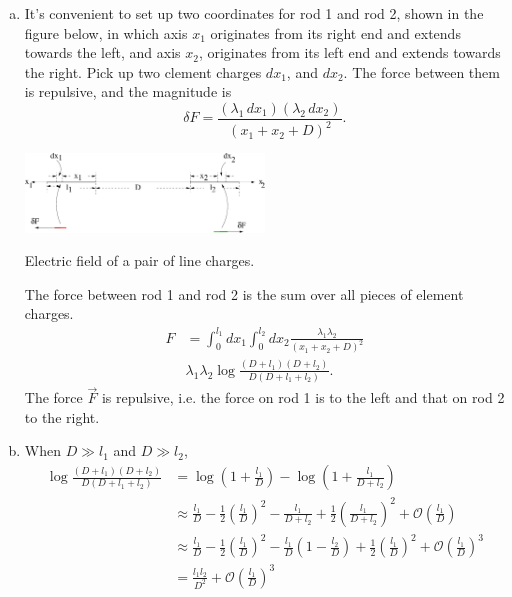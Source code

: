 \documentclass{esg8022pset}
\begin{document}
\begin{solution}
  \begin{enumerate}[(a)]
    \item It's convenient to set up two coordinates for rod 1 and rod 2, shown in the figure below, in which axis $x_1$ originates from its right end and extends towards the left, and axis $x_2$, originates from its left end and extends towards the right.  Pick up two clement charges $dx_1$, and $dx_2$. The force between them is repulsive, and the magnitude is 
    \begin{equation*}
      \delta F = \frac{(\lambda_1\,dx_1)(\lambda_2\,dx_2)}{(x_1 + x_2 + D)^2}.
    \end{equation*}
    \begin{center}\includegraphics[width=0.5\textwidth]{ps01_sol_08}\end{center}
    \begin{center}Electric field of a pair of line charges.\end{center}
    The force between rod 1 and rod 2 is the sum over all pieces of element charges.
    \begin{align*}
      F & = \int_0^{l_1}dx_1\int_0^{l_2}dx_2\frac{\lambda_1\lambda_2}{(x_1 + x_2 + D)^2} \\
        & \lambda_1 \lambda_2 \log\frac{(D + l_1)(D + l_2)}{D(D + l_1 + l_2)}.
    \end{align*}
    The force $\vec F$ is repulsive, i.e. the force on rod 1 is to the left and that on rod 2 to the right.
  \item When $D \gg l_1$ and $D \gg l_2$,
    \begin{align*}
      \log\frac{(D + l_1)(D + l_2)}{D(D + l_1 + l_2)} & = \log(1 + \frac{l_1}{D}) - \log(1 + \frac{l_1}{D + l_2}) \\
        & \approx \frac{l_1}{D} - \frac12 \left(\frac{l_1}{D}\right)^2 - \frac{l_1}{D + l_2} + \frac12 \left(\frac{l_1}{D + l_2}\right)^2 + \mathcal O\left(\frac{l_1}{D}\right) \\
        & \approx \frac{l_1}{D} - \frac12\left(\frac{l_1}{D}\right)^2 - \frac{l_1}{D}(1 - \frac{l_2}{D}) + \frac12 \left(\frac{l_1}{D}\right)^2 + \mathcal O\left(\frac{l_1}{D}\right)^3 \\
        & = \frac{l_1 l_2}{D^2} + \mathcal O\left(\frac{l_1}{D}\right)^3

\end{align*}
\end{enumerate}
\end{solution}
\end{document}
